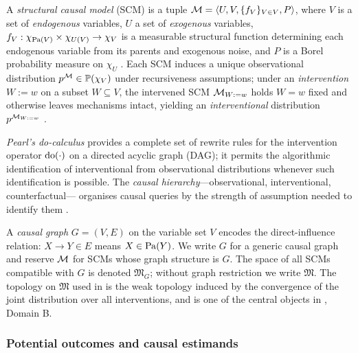 A \emph{structural causal model} (SCM) is a tuple
$\mathcal{M} = \langle U, V, \{f_V\}_{V \in V}, P \rangle$, where $V$ is a set of
\emph{endogenous} variables, $U$ a set of \emph{exogenous} variables,
$f_V : \chi_{\operatorname{Pa}(V)} \times \chi_{U(V)} \to \chi_V$ is a measurable
structural function determining each endogenous variable from its parents
and exogenous noise, and $P$ is a Borel probability measure on $\chi_U$
\citep{pearl2009causality,bongers2021foundations,
ibeling2021topological}. Each SCM induces a unique observational
distribution $p^{\mathcal{M}} \in \mathbb{P}(\chi_V)$ under recursiveness assumptions;
under an \emph{intervention} $W := w$ on a subset $W \subseteq V$, the
intervened SCM $\mathcal{M}_{W := w}$ holds $W = w$ fixed and otherwise leaves
mechanisms intact, yielding an \emph{interventional} distribution
$p^{\mathcal{M}_{W := w}}$ \citep{pearl2009causality}.

\emph{Pearl's do-calculus} \citep{pearl1995causal,tian2002general,
lee2019general} provides a complete set of rewrite rules for the
intervention operator $\mathrm{do}(\cdot)$ on a directed acyclic graph (DAG); it
permits the algorithmic identification of interventional from
observational distributions whenever such identification is possible. The
\emph{causal hierarchy}---observational, interventional, counterfactual---
organises causal queries by the strength of assumption needed to identify
them \citep{bareinboim2020pearls,ibeling2021topological}.

A \emph{causal graph} $G = (V, E)$ on the variable set $V$ encodes the
direct-influence relation: $X \to Y \in E$ means $X \in \operatorname{Pa}(Y)$. We write
$G$ for a generic causal graph and reserve $\mathcal{M}$ for SCMs whose graph
structure is $G$. The space of all SCMs compatible with $G$ is denoted
$\mathfrak{M}_G$; without graph restriction we write $\mathfrak{M}$. The
topology on $\mathfrak{M}$ used in \citet{ibeling2021topological} is the
weak topology induced by the convergence of the joint distribution over
all interventions, and is one of the central objects in
, Domain B.

\subsubsection{Potential outcomes and causal estimands}

